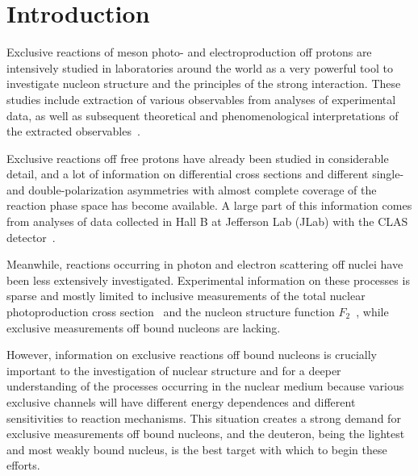\documentclass[prc,twocolumn,superscriptaddress,showpacs,amssymb,amsmath,amsfonts,aps,nofootinbib]{revtex4-1}
\begin{document}

\maketitle



\section{Introduction  }
\label{intro}



Exclusive reactions of meson photo- and electroproduction off protons are intensively studied in laboratories around the world as a very powerful tool to investigate nucleon structure and the principles of the strong interaction. These studies include extraction of various observables from analyses of experimental data, as well as subsequent theoretical and phenomenological interpretations of the extracted observables~\cite{Krusche:2003ik,Aznauryan:2011qj,Skorodumina:2016pnb,Ireland:2019uwn,Thiel:2022xtb}.


Exclusive reactions off free protons have already been studied in considerable detail, and a lot of information on differential cross sections and different single- and double-polarization asymmetries with almost complete coverage of the reaction phase space has become available. A large part of this information comes from analyses of data collected in Hall B at Jefferson Lab (JLab) with the CLAS detector~\cite{Mecking:2003zu,CLAS_DB}.


Meanwhile, reactions occurring in photon and electron scattering off nuclei have been less extensively investigated. Experimental information on these processes is sparse and mostly limited to inclusive measurements of the total nuclear photoproduction cross section~\cite{Mokeev:1995fy,Bianchi:1994ax,Ahrens:1986hn} and the nucleon structure function $F_{\text{2}}$~\cite{Osipenko_2005_note,Osipenko:2005gt,Osipenko:2010sb}, while exclusive measurements off bound nucleons are lacking.


However, information on exclusive reactions off bound nucleons is crucially important to the investigation of nuclear structure and for a deeper understanding of the processes occurring in the nuclear medium because various exclusive channels will have different energy dependences and different sensitivities to reaction mechanisms. This situation creates a strong demand for exclusive measurements off bound nucleons, and the deuteron, being the lightest and most weakly bound nucleus, is the best target with which to begin these efforts.
\end{document}
